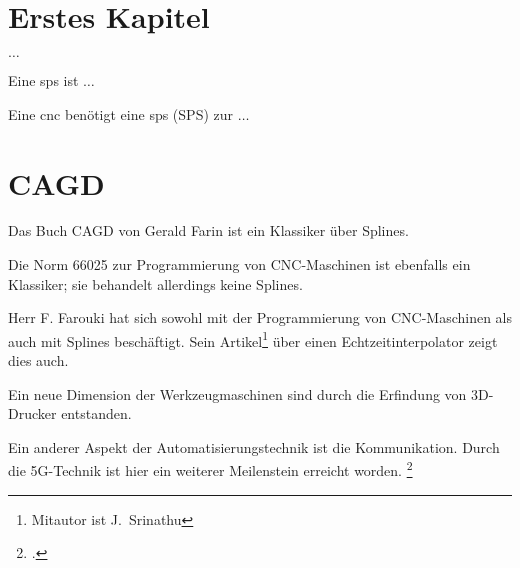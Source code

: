 %
%
%



\chapter{Erstes Kapitel}

$\ldots$

Eine \ac{sps} ist $\ldots$
\bigskip


Eine \ac{cnc} benötigt eine \ac{sps}  (SPS)  zur $\ldots$

\chapter{CAGD}

\blindtext

Das Buch CAGD von Gerald Farin ist ein Klassiker über Splines. \autocite{Farin:2002}

\bigskip

Die Norm 66025 zur Programmierung von CNC-Maschinen ist ebenfalls ein Klassiker; sie behandelt allerdings keine Splines. \autocite{DIN66025}

\bigskip

Herr F. Farouki hat sich sowohl mit der Programmierung von CNC-Maschinen als auch mit Splines beschäftigt. Sein Artikel\footnote{Mitautor ist J.~Srinathu} über einen Echtzeitinterpolator zeigt dies auch. \autocite{Farouki:2017}

\bigskip

Ein neue Dimension der Werkzeugmaschinen sind durch die Erfindung von 3D-Drucker entstanden. \autocite{Patent3D}

\bigskip


Ein anderer Aspekt der Automatisierungstechnik ist die Kommunikation. Durch die 5G-Technik ist hier ein
weiterer Meilenstein erreicht worden. \footcite{Zafeiropoulos:2020}


